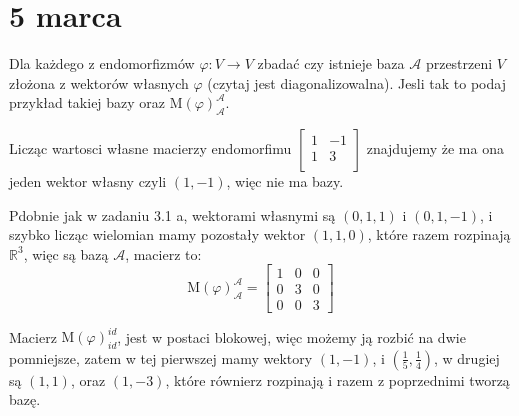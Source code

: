 \documentclass[11pt]{scrartcl}
\begin{document}
   \section{5 marca}
       

   \begin{zadanie}
       Dla każdego z endomorfizmów $ \varphi  : V \to V$ zbadać czy istnieje baza $\mathcal{A} $ przestrzeni $V$ złożona z wektorów własnych $\varphi$ (czytaj jest diagonalizowalna). Jesli tak to podaj przykład takiej bazy oraz $\text{M} \left ( \varphi \right )_{\mathcal{A}}^{\mathcal{A}}$.
   \end{zadanie}
   
   \begin{walk}
       \item Licząc wartosci własne macierzy endomorfimu $
         \begin{bmatrix}
             1 & -1 \\
             1 & 3 \\
         \end{bmatrix}
         $
         znajdujemy że ma ona jeden wektor własny czyli $\left ( 1, -1 \right )$, więc nie ma bazy.
       \item Pdobnie jak w zadaniu 3.1 a, wektorami własnymi są $\left ( 0,1,1 \right )$ i $\left ( 0, 1, -1 \right )$, i szybko licząc wielomian mamy pozostały wektor $\left ( 1,1, 0 \right )$, które razem rozpinają $\mathbb{R}^3$, więc są bazą $\mathcal{A} $,  macierz to:
         \[
           \text{M} \left ( \varphi \right )_{\mathcal{A}}^{\mathcal{A}} = 
             \begin{bmatrix}
               1 & 0 & 0 \\
              0 & 3 & 0 \\
               0 & 0 & 3 
             \end{bmatrix}
         \]
      \item Macierz $\text{M} \left ( \varphi \right )_{id}^{id}$, jest w postaci blokowej, więc możemy ją rozbić na dwie pomniejsze, zatem w tej pierwszej mamy wektory $\left ( 1, -1 \right )$, i $\left ( \frac{1}{5}, \frac{1}{4} \right )$,  w drugiej są $\left ( 1,1 \right )$, oraz $\left ( 1, -3 \right )$, które równierz rozpinają i razem z poprzednimi tworzą bazę.
   \end{walk}
\end{document}
